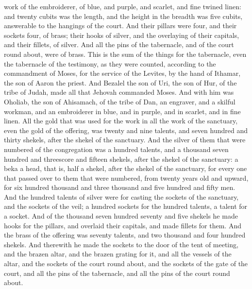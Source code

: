 work of the embroiderer, of blue, and purple, and scarlet, and fine twined linen: and twenty cubits was the length, and the height in the breadth was five cubits, answerable to the hangings of the court. And their pillars were four, and their sockets four, of brass; their hooks of silver, and the overlaying of their capitals, and their fillets, of silver. And all the pins of the tabernacle, and of the court round about, were of brass.  This is the sum of the things for the tabernacle, even the tabernacle of the testimony, as they were counted, according to the commandment of Moses, for the service of the Levites, by the hand of Ithamar, the son of Aaron the priest. And Bezalel the son of Uri, the son of Hur, of the tribe of Judah, made all that Jehovah commanded Moses. And with him was Oholiab, the son of Ahisamach, of the tribe of Dan, an engraver, and a skilful workman, and an embroiderer in blue, and in purple, and in scarlet, and in fine linen.  All the gold that was used for the work in all the work of the sanctuary, even the gold of the offering, was twenty and nine talents, and seven hundred and thirty shekels, after the shekel of the sanctuary. And the silver of them that were numbered of the congregation was a hundred talents, and a thousand seven hundred and threescore and fifteen shekels, after the shekel of the sanctuary: a beka a head, that is, half a shekel, after the shekel of the sanctuary, for every one that passed over to them that were numbered, from twenty years old and upward, for six hundred thousand and three thousand and five hundred and fifty men. And the hundred talents of silver were for casting the sockets of the sanctuary, and the sockets of the veil; a hundred sockets for the hundred talents, a talent for a socket. And of the thousand seven hundred seventy and five shekels he made hooks for the pillars, and overlaid their capitals, and made fillets for them. And the brass of the offering was seventy talents, and two thousand and four hundred shekels. And therewith he made the sockets to the door of the tent of meeting, and the brazen altar, and the brazen grating for it, and all the vessels of the altar, and the sockets of the court round about, and the sockets of the gate of the court, and all the pins of the tabernacle, and all the pins of the court round about. 

